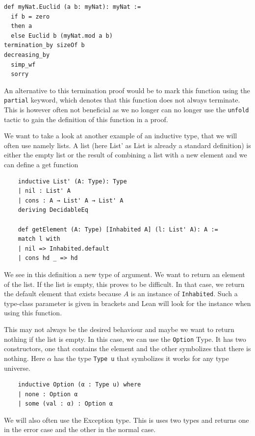 \begin{lstlisting}
def myNat.Euclid (a b: myNat): myNat :=
  if b = zero
  then a
  else Euclid b (myNat.mod a b)
termination_by sizeOf b
decreasing_by
  simp_wf
  sorry
\end{lstlisting}

An alternative to this termination proof would be to mark this function using the \lstinline|partial| keyword, which denotes that this function does not always terminate. This is however often not beneficial as we no longer can no longer use the \lstinline|unfold| tactic to gain the definition of this function in a proof.



We want to take a look at another example of an inductive type, that we will often use namely lists. A list (here List' as List is already a standard definition) is either the empty list or the result of combining a list with a new element and we can define a get function

\begin{lstlisting}
    inductive List' (A: Type): Type
    | nil : List' A
    | cons : A → List' A → List' A
    deriving DecidableEq

    def getElement (A: Type) [Inhabited A] (l: List' A): A :=
    match l with
    | nil => Inhabited.default
    | cons hd _ => hd
\end{lstlisting}

We see in this definition a new type of argument. We want to return an element of the list. If the list is empty, this proves to be difficult. In that case, we return the default element that exists because $A$ is an instance of \lstinline|Inhabited|. Such a type-class parameter is given in brackets and Lean will look for the instance when using this function.

This may not always be the desired behaviour and maybe we want to return nothing if the list is empty. In this case, we can use the \lstinline|Option| Type. It has two constructors, one that contains the element and the other symbolizes that there is nothing. Here $\alpha$ has the type \lstinline|Type u| that symbolizes it works for any type universe.

\begin{lstlisting}
    inductive Option (α : Type u) where
    | none : Option α
    | some (val : α) : Option α
\end{lstlisting}

We will also often use the Exception type. This is uses two types and returns one in the error case and the other in the normal case.

